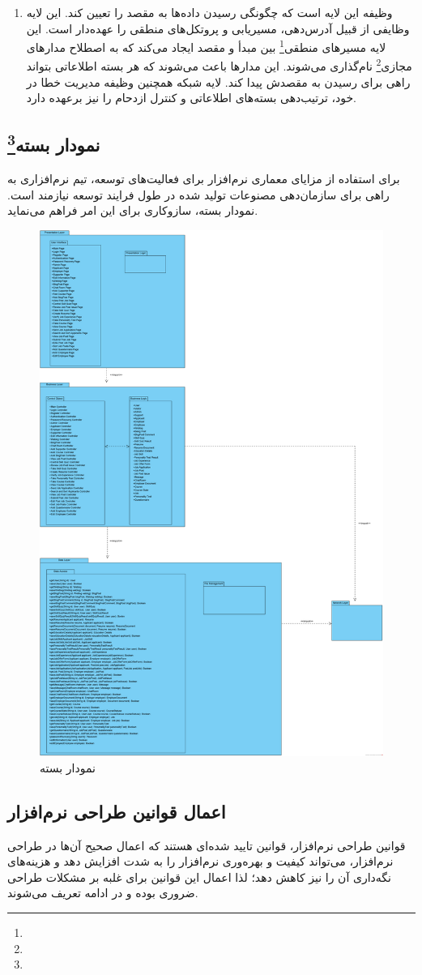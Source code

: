 \documentclass[12pt]{article}
\begin{document}
\begin{enumerate}
	\item {}
	وظیفه این لایه است که چگونگی رسیدن داده‌ها به مقصد را تعیین کند. این لایه وظایفی از قبیل آدرس‌دهی، مسیریابی و پروتکل‌های منطقی را عهده‌دار است. این لایه مسیرهای منطقی\footnote{} بین مبدأ و مقصد ایجاد می‌کند که به اصطلاح مدارهای مجازی\footnote{} نام‌گذاری می‌شوند. این مدارها باعث می‌شوند که هر بسته اطلاعاتی بتواند راهی برای رسیدن به مقصدش پیدا کند. لایه شبکه همچنین وظیفه مدیریت خطا در خود، ترتیب‌دهی بسته‌های اطلاعاتی و کنترل ازدحام را نیز برعهده دارد.

	\end{enumerate}

	\subsection{نمودار بسته\footnote{}}
	برای استفاده از مزایای معماری نرم‌افزار برای فعالیت‌های توسعه، تیم نرم‌افزاری به راهی برای سازمان‌دهی مصنوعات تولید شده در طول فرایند توسعه نیازمند است. نمودار بسته، سازوکاری برای این امر فراهم می‌نماید.
	\begin{figure}[H]
		\centering
		\includegraphics[width=0.5\linewidth]{files/Project_OOAD_Phase2_PackageDiagram}
		\caption{نمودار بسته}
		\label{fig:packagediagram}
	\end{figure}

	\subsection{اعمال قوانین طراحی نرم‌افزار}
	قوانین طراحی نرم‌افزار، قوانین تایید شده‌ای هستند که اعمال صحیح آن‌ها در طراحی نرم‌افزار، می‌تواند کیفیت و بهره‌وری نرم‌افزار را به شدت افزایش دهد و هزینه‌های نگه‌داری آن را نیز کاهش دهد؛ لذا اعمال این قوانین برای غلبه بر مشکلات طراحی ضروری بوده و در ادامه تعریف می‌شوند.
\end{document}
